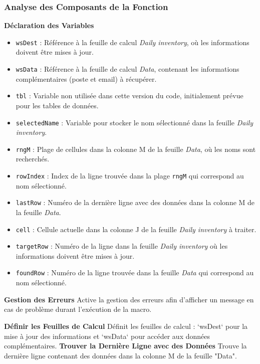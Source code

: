 \documentclass[a4paper, oneside, 12pt, final]{extreport}
\begin{document}
\subsubsection{Analyse des Composants de la Fonction}

\textbf{Déclaration des Variables}

\begin{itemize}
    \item \texttt{wsDest} : Référence à la feuille de calcul \textit{Daily inventory}, où les informations doivent être mises à jour.
    \item \texttt{wsData} : Référence à la feuille de calcul \textit{Data}, contenant les informations complémentaires (poste et email) à récupérer.
    \item \texttt{tbl} : Variable non utilisée dans cette version du code, initialement prévue pour les tables de données.
    \item \texttt{selectedName} : Variable pour stocker le nom sélectionné dans la feuille \textit{Daily inventory}.
    \item \texttt{rngM} : Plage de cellules dans la colonne M de la feuille \textit{Data}, où les noms sont recherchés.
    \item \texttt{rowIndex} : Index de la ligne trouvée dans la plage \texttt{rngM} qui correspond au nom sélectionné.
    \item \texttt{lastRow} : Numéro de la dernière ligne avec des données dans la colonne M de la feuille \textit{Data}.
    \item \texttt{cell} : Cellule actuelle dans la colonne J de la feuille \textit{Daily inventory} à traiter.
    \item \texttt{targetRow} : Numéro de la ligne dans la feuille \textit{Daily inventory} où les informations doivent être mises à jour.
    \item \texttt{foundRow} : Numéro de la ligne trouvée dans la feuille \textit{Data} qui correspond au nom sélectionné.
\end{itemize}

\textbf{Gestion des Erreurs}
Active la gestion des erreurs afin d'afficher un message en cas de problème durant l'exécution de la macro.

\textbf{Définir les Feuilles de Calcul}
Définit les feuilles de calcul : `wsDest` pour la mise à jour des informations et `wsData` pour accéder aux données complémentaires.
\textbf{Trouver la Dernière Ligne avec des Données}
Trouve la dernière ligne contenant des données dans la colonne M de la feuille "Data".
\end{document}
